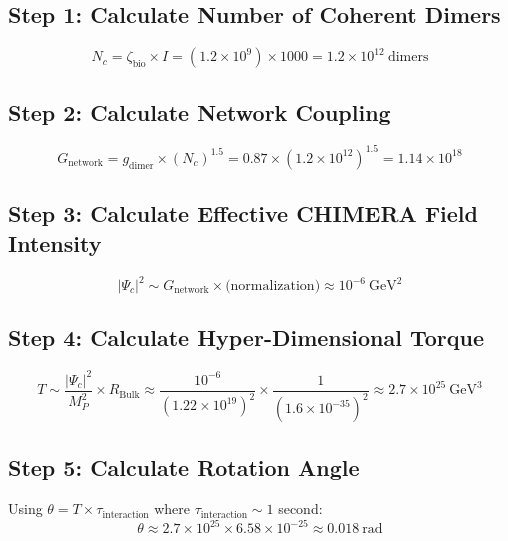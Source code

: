 \subsection*{Step 1: Calculate Number of Coherent Dimers}

\begin{equation}
N_c = \zeta_{\text{bio}} \times I = (1.2 \times 10^9) \times 1000 = 1.2 \times 10^{12}\ \text{dimers}
\end{equation}

\subsection*{Step 2: Calculate Network Coupling}

\begin{equation}
G_{\text{network}} = g_{\text{dimer}} \times (N_c)^{1.5} = 0.87 \times (1.2 \times 10^{12})^{1.5} = 1.14 \times 10^{18}
\end{equation}

\subsection*{Step 3: Calculate Effective CHIMERA Field Intensity}

\begin{equation}
|\Psi_c|^2 \sim G_{\text{network}} \times \text{(normalization)} \approx 10^{-6}\ \text{GeV}^2
\end{equation}

\subsection*{Step 4: Calculate Hyper-Dimensional Torque}

\begin{equation}
T \sim \frac{|\Psi_c|^2}{M_P^2} \times R_{\text{Bulk}} \approx \frac{10^{-6}}{(1.22 \times 10^{19})^2} \times \frac{1}{(1.6 \times 10^{-35})^2} \approx 2.7 \times 10^{25}\ \text{GeV}^3
\end{equation}

\subsection*{Step 5: Calculate Rotation Angle}

Using $\theta = T \times \tau_{\text{interaction}}$ where $\tau_{\text{interaction}} \sim 1$ second:
\begin{equation}
\theta \approx 2.7 \times 10^{25} \times 6.58 \times 10^{-25} \approx 0.018\ \text{rad}
\end{equation}

